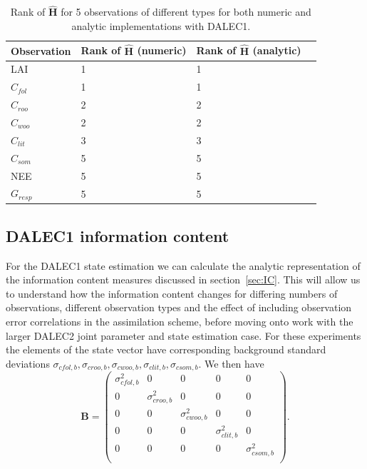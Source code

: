 \documentclass[11pt]{article}
\begin{document}
\begin{table}[ht] 
\begin{center}
	\begin{tabular}{| l | l | l | l}
	\hline
	Observation & Rank of $\hat{\textbf{H}}$ (numeric) & Rank of $\hat{\textbf{H}}$ (analytic) \\ \hline
	LAI & 1 & 1 \\ \hline
	$C_{fol}$ & 1 & 1  \\ \hline
	$C_{roo}$ & 2 & 2 \\ \hline
	$C_{woo}$ & 2 & 2 \\ \hline
	$C_{lit}$ & 3 & 3 \\ \hline
	$C_{som}$ & 5 & 5 \\ \hline
	NEE & 5 & 5 \\ \hline
	$G_{resp}$ & 5 & 5 \\  
	\hline
	\end{tabular}
	\caption{Rank of $\hat{\textbf{H}}$ for 5 observations of different types for both numeric and analytic implementations with DALEC1.}
	\label{table: a_n_h_D1}
\end{center} 
\end{table}

\subsection{DALEC1 information content}

For the DALEC1 state estimation we can calculate the analytic representation of the information content measures discussed in section~\ref{sec:IC}. This will allow us to understand how the information content changes for differing numbers of observations, different observation types and the effect of including observation error correlations in the assimilation scheme, before moving onto work with the larger DALEC2 joint parameter and state estimation case. For these experiments the elements of the state vector have corresponding background standard deviations $ \sigma_{cfol, b}, \sigma_{croo, b}, \sigma_{cwoo, b}, \sigma_{clit, b}, \sigma_{csom, b}$. We then have
\begin{equation}
\bm{B} = \begin{pmatrix} 
\sigma_{cfol,b}^{2} & 0 & 0 & 0 & 0 \\
0 & \sigma_{croo,b}^{2} & 0 & 0 & 0 \\
0 & 0 & \sigma_{cwoo,b}^{2} & 0 & 0 \\
0 & 0 & 0 & \sigma_{clit,b}^{2} & 0 \\
0 & 0 & 0 & 0 & \sigma_{csom,b}^{2} \\
\end{pmatrix}. \label{eqn:BmatD1}
\end{equation}   
\end{document}
